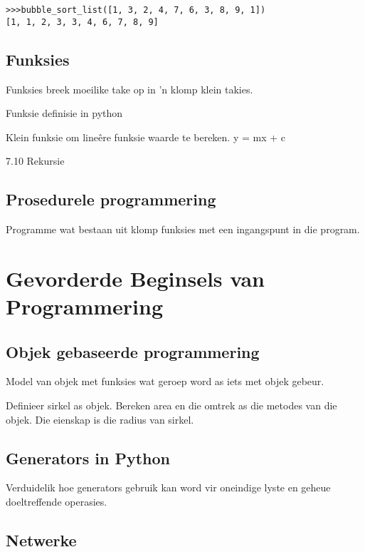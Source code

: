 \begin{lstlisting}[style=DOS]
>>>bubble_sort_list([1, 3, 2, 4, 7, 6, 3, 8, 9, 1])
[1, 1, 2, 3, 3, 4, 6, 7, 8, 9]
\end{lstlisting}


\chapter[Funksies]
{Funksies}


Funksies breek moeilike take op in 'n klomp klein takies.

Funksie definisie in python

Klein funksie om line\^{e}re funksie waarde te bereken. y = mx + c


7.10  Rekursie

\chapter[Prosedurele programmering]
{Prosedurele programmering}


Programme wat bestaan uit klomp funksies met een ingangspunt in die program.

\part[Gevorderde Beginsels]
{Gevorderde Beginsels van\\ Programmering}

\chapter[Objek gebaseerde programmering]
{Objek gebaseerde programmering}


Model van objek met funksies wat geroep word as iets met objek gebeur.

Definieer sirkel as objek.  Bereken area en die omtrek as die metodes van die objek.  Die eienskap is die radius van sirkel.

\chapter[Generators]
{Generators in Python}

Verduidelik hoe generators gebruik kan word vir oneindige lyste en geheue doeltreffende operasies.

\chapter[Netwerke]
{Netwerke}

